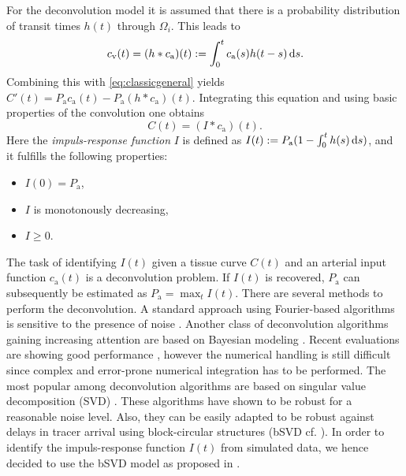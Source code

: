 \documentclass[paper=a4, fontsize=11pt,parskip=half,headings=small]{scrartcl}
\newcommand{\ca}{c_\mathrm{a}}
\newcommand{\cout}{c_{\mathrm{v}}}
\newcommand{\Pa}{P_{\mathrm{a}}}
\begin{document}
	For the deconvolution model it is assumed that there is a probability distribution of transit times $h(t)$ through $\Omega_i$. 
	This leads to
	\begin{equation}
		\cout(t) = (h*\ca)(t) := \int_0^t \ca(s) h(t-s) \diffint s.
	\end{equation}
	Combining this with \eqref{eq:classicgeneral} yields $C'(t) = \Pa\ca(t)-\Pa (h*\ca)(t)$.
	Integrating this equation and using basic properties of the convolution one obtains
	\begin{equation}
		C(t) = (I*\ca)(t).
		\label{eq:conv}
	\end{equation}
	Here the \emph{impuls-response function} $I$ is defined as $I(t) := \Pa(1-\int_0^t h(s) \diffint s)$, and it fulfills the following properties:
	\begin{itemize}
		\item $I(0) = \Pa$,
		\item $I$ is monotonously decreasing,
		\item $I\ge 0$.		
	\end{itemize}
	The task of identifying $I(t)$ given a tissue curve $C(t)$ and an arterial input function $\ca(t)$ is a deconvolution problem.
	If $I(t)$ is recovered, $\Pa$ can subsequently be estimated as $\Pa = \max_{t} I(t)$.
	There are several methods to perform the deconvolution.
	A standard approach using Fourier-based algorithms is sensitive to the presence of noise \cite{ostergaard96,wirestam00}.
	Another class of deconvolution algorithms gaining increasing attention are based on Bayesian modeling \cite{boutelier12,mouridsen06}.
	Recent evaluations are showing good performance \cite{sasaki13}, however the numerical handling is still difficult since complex and error-prone numerical integration has to be performed.
	The most popular among deconvolution algorithms are based on singular value decomposition (SVD) \cite{ostergaard96}.
	These algorithms have shown to be robust for a reasonable noise level.
	Also, they can be easily adapted to be robust against delays in tracer arrival using block-circular structures (bSVD cf. \cite{wu03}).
	In order to identify the impuls-response function $I(t)$ from simulated data, we hence decided to use the bSVD model as proposed in \cite{wu03}.

\end{document}
